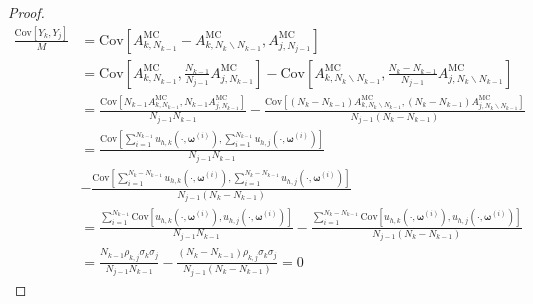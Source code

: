 \begin{lemma}
\begin{proof}
\begin{align*}
    \frac{\text{Cov}\left[Y_k,Y_j\right]}{M} &= \text{Cov}\left[A_{k,N_{k-1}}^{\text{MC}} - A_{k,N_{k}\backslash N_{k-1}}^{\text{MC}}, A_{j,N_{j-1}}^{\text{MC}}\right]\\
    &=\text{Cov}\left[A_{k,N_{k-1}}^{\text{MC}}, \frac{N_{k-1}}{N_{j-1}}A_{j,N_{k-1}}^{\text{MC}}\right]-\text{Cov}\left[ A_{k,N_{k}\backslash N_{k-1}}^{\text{MC}}, \frac{N_k - N_{k-1}}{N_{j-1}} A_{j,N_{k}\backslash N_{k-1}}^{\text{MC}} \right]\\
    &=\frac{\text{Cov}\left[N_{k-1}A_{k,N_{k-1}}^{\text{MC}}, N_{k-1} A_{j,N_{k-1}}^{\text{MC}}\right]}{N_{j-1}N_{k-1}}-\frac{\text{Cov}\left[(N_k-N_{k-1}) A_{k,N_{k}\backslash N_{k-1}}^{\text{MC}}, (N_k - N_{k-1}) A_{j,N_{k}\backslash N_{k-1}}^{\text{MC}} \right]}{N_{j-1}(N_k-N_{k-1})}\\
    &=\frac{\text{Cov}\left[\sum_{i=1}^{N_{k-1}}u_{h,k}\left(\cdot, \boldsymbol{\omega}^{(i)}\right),\sum_{i=1}^{N_{k-1}}u_{h,j}\left(\cdot, \boldsymbol{\omega}^{(i)}\right)\right]}{N_{j-1}N_{k-1}}\\
    &-\frac{\text{Cov}\left[\sum_{i=1}^{N_k-N_{k-1}}u_{h,k}\left(\cdot, \boldsymbol{\omega}^{(i)}\right), \sum_{i=1}^{N_k-N_{k-1}}u_{h,j}\left(\cdot, \boldsymbol{\omega}^{(i)}\right)\right]}{N_{j-1}(N_k-N_{k-1})}\\
    &=\frac{\sum_{i=1}^{N_{k-1}}\text{Cov}\left[u_{h,k}\left(\cdot, \boldsymbol{\omega}^{(i)}\right),u_{h,j}\left(\cdot, \boldsymbol{\omega}^{(i)}\right)\right]}{N_{j-1}N_{k-1}} -\frac{\sum_{i=1}^{N_k-N_{k-1}}\text{Cov}\left[u_{h,k}\left(\cdot, \boldsymbol{\omega}^{(i)}\right), u_{h,j}\left(\cdot, \boldsymbol{\omega}^{(i)}\right)\right]}{N_{j-1}(N_k-N_{k-1})}\\
    &=\frac{N_{k-1}\rho_{k,j}\sigma_k\sigma_j}{N_{j-1}N_{k-1}}-\frac{(N_k-N_{k-1})\rho_{k,j}\sigma_k\sigma_j}{N_{j-1}(N_k-N_{k-1})}=0
\end{align*}
\end{proof}


\end{lemma}